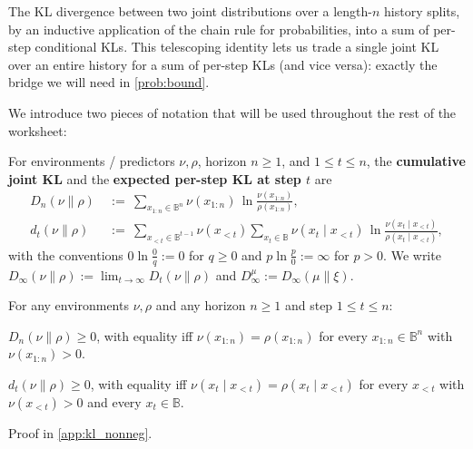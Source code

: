 \documentclass[fontsize=11pt, parskip=half]{scrartcl}
\begin{document}
The KL divergence between two joint distributions over a length-$n$ history splits, by an inductive application of the chain rule for probabilities, into a sum of per-step conditional KLs. This telescoping identity lets us trade a single joint KL over an entire history for a sum of per-step KLs (and vice versa): exactly the bridge we will need in \cref{prob:bound}.

We introduce two pieces of notation that will be used throughout the rest of the worksheet:

\begin{definition}\label{def:Dn}
For environments / predictors $\nu, \rho$, horizon $n \geq 1$, and $1 \leq t \leq n$, the \textbf{cumulative joint KL} and the \textbf{expected per-step KL at step $t$} are
\begin{align*}
  D_n(\nu \parallel \rho) ~&:=~ \sum_{x_{1:n} \in \mathbb{B}^n}
                       \nu(x_{1:n}) \,\ln \frac{\nu(x_{1:n})}{\rho(x_{1:n})}, \\[6pt]
  d_t(\nu \parallel \rho) ~&:=~ \sum_{x_{<t} \in \mathbb{B}^{t-1}}
                       \nu(x_{<t}) \sum_{x_t \in \mathbb{B}}
                       \nu(x_t \mid x_{<t}) \,\ln \frac{\nu(x_t \mid x_{<t})}{\rho(x_t \mid x_{<t})},
\end{align*}
with the conventions $0 \ln \tfrac{0}{q} := 0$ for $q \geq 0$ and $p \ln \tfrac{p}{0} := \infty$ for $p > 0$. 
We write $D_\infty(\nu \parallel \rho) := \lim_{t \to \infty} D_t(\nu \parallel \rho)$
and $D^\mu_\infty := D_\infty(\mu \parallel \xi)$.
\end{definition}

\begin{theorem}\label{thm:kl_nonneg}
For any environments $\nu, \rho$ and any horizon $n \geq 1$ and step $1 \leq t \leq n$:
\begin{description}\itemsep=2pt
  \item[\textnormal{(a)}] $D_n(\nu \parallel \rho) \geq 0$, with equality iff $\nu(x_{1:n}) = \rho(x_{1:n})$ for every $x_{1:n} \in \mathbb{B}^n$ with $\nu(x_{1:n}) > 0$.
  \item[\textnormal{(b)}] $d_t(\nu \parallel \rho) \geq 0$, with equality iff $\nu(x_t \mid x_{<t}) = \rho(x_t \mid x_{<t})$ for every $x_{<t}$ with $\nu(x_{<t}) > 0$ and every $x_t \in \mathbb{B}$.
\end{description}
Proof in \cref{app:kl_nonneg}.
\end{theorem}
\end{document}
